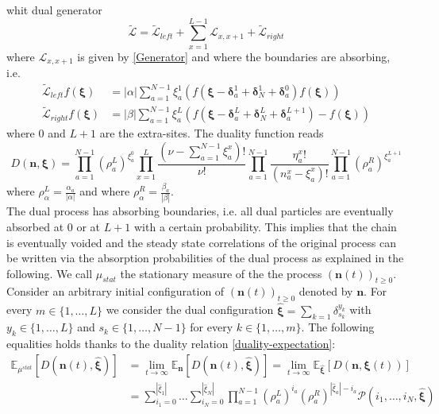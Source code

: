 \documentclass[10pt]{article}
\numberwithin{equation}{section}
\numberwithin{equation}{subsection}
\begin{document}
whit dual generator
\begin{equation}
	\widetilde{\mathcal{L}}=\widetilde{\mathcal{L}}_{left}+\sum_{x=1}^{L-1}\mathcal{L}_{x,x+1}+\widetilde{\mathcal{L}}_{right}
\end{equation} 
where $\mathcal{L}_{x,x+1}$ is given by \eqref{Generator} and where the boundaries are absorbing, i.e. 
\begin{equation}\label{abs-dual-boundary-chain}
	\begin{split}
		\widetilde{\mathcal{L}}_{left}f(\bm{\xi})&=|\alpha|\sum_{a=1}^{N-1}\xi_{a}^{1}\left(f(\bm{\xi}-\bm{\delta}_{a}^{1}+\bm{\delta}_{N}^{1}+\bm{\delta}_{a}^{0})f(\bm{\xi})\right)\\\widetilde{\mathcal{L}}_{right}f(\bm{\xi})&=|\beta|\sum_{a=1}^{N-1}\xi_{a}^{L}\left(f(\bm{\xi}-\bm{\delta}_{a}^{L}+\bm{\delta}_{N}^{L}+\bm{\delta}_{a}^{L+1})-f(\bm{\xi})\right)
	\end{split}
\end{equation}
where $0$ and $L+1$ are the extra-sites. The duality function reads
\begin{equation}\label{dualityFunctionChain}
	D(\bm{n},\bm{\xi})=\prod_{a=1}^{N-1}\left(\rho_{a}^{L}\right)^{\xi_{a}^{0}}\prod_{x=1}^{L}\frac{(\nu-\sum_{a=1}^{N-1}\xi_{a}^{x})!}{\nu!}\prod_{a=1}^{N-1}\frac{\eta_{a}^{x}!}{(n_{a}^{x}-\xi_{a}^{x})!}\prod_{a=1}^{N-1}\left(\rho_{a}^{R}\right)^{\xi_{a}^{L+1}}
\end{equation}
where $\rho_{\alpha}^{L}=\frac{\alpha_{a}}{|\alpha|}$ and where $\rho_{\alpha}^{R}=\frac{\beta_{a}}{|\beta|}$.\\
The dual process has absorbing boundaries, i.e. all dual particles are eventually absorbed at $0$ or at $L+1$ with a certain probability. This implies that the chain is eventually voided and the steady state correlations of the original process can be written via the absorption probabilities of the dual process as explained in the following. 
We call $\mu_{stat}$ the stationary measure of the the process $(\bm{n}(t))_{t\geq 0}$. Consider an arbitrary initial configuration of $(\bm{n}(t))_{t\geq 0}$ denoted by $\bm{n}$. For every $m\in\{1,\ldots,L\}$ we consider the dual configuration  $\bm{\widehat{\xi}}=\sum_{k=1}\delta_{s_{k}}^{y_{k}}$ with $y_{k}\in\{1,\ldots,L\}$ and $s_{k}\in \{1,\ldots,N-1\}$ for every $k\in \{1,\ldots,m\}$. The following  equalities holds thanks to the duality relation \eqref{duality-expectation}:
\begin{equation}\label{ExptationSS}
	\begin{split}
		\mathbb{E}_{\mu^{stat}}\left[D(\bm{n}(t),\hat{\bm{\xi}})\right]&=\lim_{t\to\infty}\mathbb{E}_{\bm{n}}\left[D(\bm{n}(t),\hat{\bm{\xi}})\right]=\lim_{t\to\infty}\mathbb{E}_{\hat{\bm{\xi}}}\left[D(\bm{n},\bm{\xi}(t))\right]
		\\&=
		\sum_{i_{1}=0}^{|\hat{\xi}_{1}|}\ldots\sum_{i_{N}=0}^{|\hat{\xi}_{N}|}\prod_{a=1}^{N-1}\left(\rho_{a}^{L}\right)^{i_{a}}\left(\rho_{a}^{R}\right)^{|\hat{\xi}_{a}|-i_{a}}\mathcal{P}(i_{1},\ldots,i_{N},\hat{\bm{\xi}})
	\end{split}
\end{equation}
\end{document}
